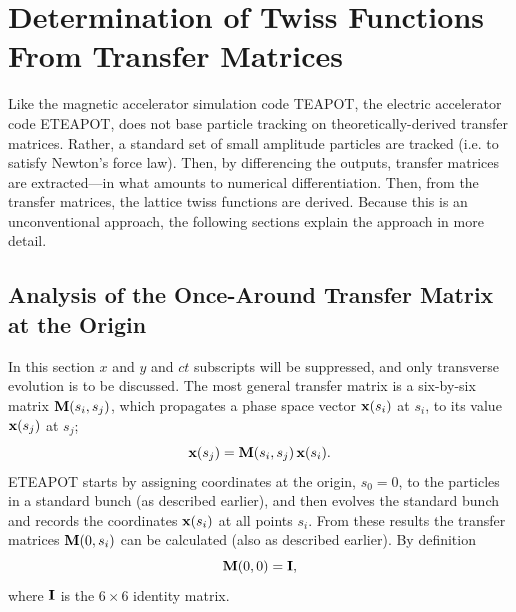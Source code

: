 \documentclass[]{article}
\begin{document}
\section{Determination of Twiss Functions From Transfer Matrices}
Like the magnetic accelerator simulation code TEAPOT, the electric accelerator
code ETEAPOT, does not base particle tracking on theoretically-derived
transfer matrices. Rather, a standard set of small amplitude particles are 
tracked (i.e. to satisfy Newton's force law). Then, by differencing the outputs,
transfer matrices are extracted---in what amounts to numerical differentiation.
Then, from the transfer matrices, the lattice twiss functions are derived. Because
this is an unconventional approach, the following sections explain the approach
in more detail.

\subsection{Analysis of the Once-Around Transfer Matrix at the Origin}
In this section $x$ and $y$ and $ct$ subscripts will be suppressed,
and only transverse evolution is to be discussed. 
The most general
transfer matrix is a six-by-six matrix ${\bf M}(s_i,s_j)$, which propagates a
phase space vector ${\bf x}(s_i)$ at $s_i$, to its value ${\bf x}(s_j)$ at $s_j$;
%
\begin{equation}
{\bf x}(s_j) 
 =
{\bf M}(s_i,s_j)\,
{\bf x}(s_i). 
\label{TM.1}
\end{equation}
%
ETEAPOT starts by assigning coordinates at the origin, $s_0=0$,
to the particles in a standard bunch (as described earlier), and then
evolves the standard bunch and records the coordinates ${\bf x}(s_i)$ 
at all points $s_i$.  From these results the transfer matrices 
${\bf M}(0,s_i)$ can be calculated (also as described earlier). By definition
%
\begin{equation}
{\bf M}(0,0)
 =
{\bf I}, 
\label{TM.2}
\end{equation}
%
where ${\bf I}$ is the $6\times6$ identity matrix. 
\end{document}
